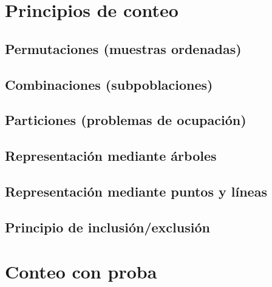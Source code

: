 \documentclass[
]{book}
\begin{document}
\hypertarget{principios-de-conteo}{%
\section{Principios de conteo}\label{principios-de-conteo}}

\hypertarget{permutaciones-muestras-ordenadas}{%
\subsection{Permutaciones (muestras ordenadas)}\label{permutaciones-muestras-ordenadas}}

\hypertarget{combinaciones-subpoblaciones}{%
\subsection{Combinaciones (subpoblaciones)}\label{combinaciones-subpoblaciones}}

\hypertarget{particiones-problemas-de-ocupaciuxf3n}{%
\subsection{Particiones (problemas de ocupación)}\label{particiones-problemas-de-ocupaciuxf3n}}

\hypertarget{representaciuxf3n-mediante-uxe1rboles}{%
\subsection{Representación mediante árboles}\label{representaciuxf3n-mediante-uxe1rboles}}

\hypertarget{representaciuxf3n-mediante-puntos-y-luxedneas}{%
\subsection{Representación mediante puntos y líneas}\label{representaciuxf3n-mediante-puntos-y-luxedneas}}

\hypertarget{principio-de-inclusiuxf3nexclusiuxf3n}{%
\subsection{Principio de inclusión/exclusión}\label{principio-de-inclusiuxf3nexclusiuxf3n}}

\hypertarget{conteo-con-proba}{%
\section{Conteo con proba}\label{conteo-con-proba}}
\end{document}

